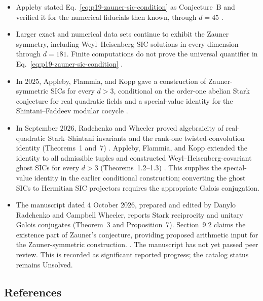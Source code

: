 \begin{itemize}
  \item Appleby stated Eq.~\eqref{eq:p19-zauner-sic-condition} as
  Conjecture~B and verified it for the numerical fiducials then known, through
  $d=45$ .

  \item Larger exact and numerical data sets continue to exhibit the Zauner
  symmetry, including Weyl--Heisenberg SIC solutions in every dimension
  through $d=181$.  Finite computations do not prove the universal
  quantifier in Eq.~\eqref{eq:p19-zauner-sic-condition}
  .

  \item In $2025$, Appleby, Flammia, and Kopp gave a construction of
  Zauner-symmetric SICs for every $d>3$, conditional on the order-one abelian
  Stark conjecture for real quadratic fields and a special-value identity
  for the Shintani--Faddeev modular cocycle
  .

  \item In September $2026$, Radchenko and Wheeler proved algebraicity of
  real-quadratic Stark--Shintani invariants and the rank-one
  twisted-convolution identity (Theorems~1 and~7)
  .
  Appleby, Flammia, and Kopp extended the identity to all admissible tuples
  and constructed Weyl--Heisenberg-covariant ghost SICs for every $d>3$
  (Theorems~1.2--1.3) .
  This supplies the special-value identity in the earlier conditional
  construction; converting the ghost SICs to Hermitian SIC projectors
  requires the appropriate Galois conjugation.

  \item The manuscript dated 4 October $2026$, prepared and edited by Danylo
  Radchenko and Campbell Wheeler, reports Stark reciprocity and unitary
  Galois conjugates (Theorem~3 and Proposition~7). Section~9.2 claims the existence part of Zauner's conjecture,
  providing proposed arithmetic input for the Zauner-symmetric construction.
  .
  The manuscript has not yet passed peer review. This is recorded as
  significant reported progress; the catalog status remains Unsolved.
\end{itemize}

\subsection*{References}

